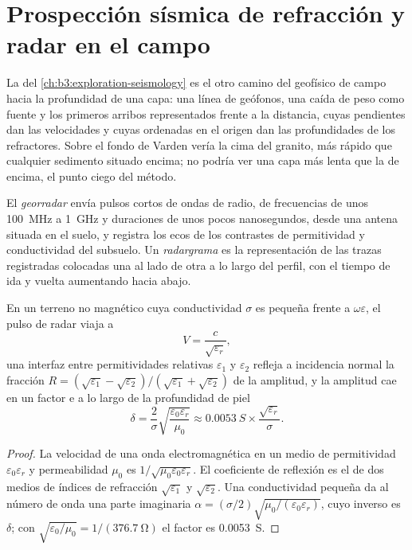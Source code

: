 \section{Prospección sísmica de refracción y radar en el campo}\label{sec:b3:field-lab-methods-3:radar}

La  del \cref{ch:b3:exploration-seismology}
es el otro camino del geofísico de campo hacia la profundidad de una capa: una
línea de geófonos, una caída de peso como fuente y los primeros arribos
representados frente a la distancia, cuyas pendientes dan las velocidades y cuyas
ordenadas en el origen dan las profundidades de los refractores. Sobre el fondo de Varden
vería la cima del granito, más rápido que cualquier sedimento situado encima; no
podría ver una capa más lenta que la de encima, el punto ciego del
método.

\begin{definition}\label{def:b3:field-lab-methods-3:gpr}
El \emph{georradar} envía
pulsos cortos de ondas de radio, de frecuencias de unos \qty{100}{MHz}
a \qty{1}{GHz} y duraciones de unos pocos nanosegundos, desde una antena
situada en el suelo, y registra los ecos de los contrastes de permitividad y
conductividad del subsuelo. Un \emph{radargrama} es la representación
de las trazas registradas colocadas una al lado de otra a lo largo del perfil, con el
tiempo de ida y vuelta aumentando hacia abajo.
\end{definition}

\begin{proposition}\label{prop:b3:field-lab-methods-3:radar}
En un terreno no magnético cuya conductividad $\sigma$ es pequeña frente a
$\omega\varepsilon$, el pulso de radar viaja a
\[
V = \frac{c}{\sqrt{\varepsilon_r}} ,
\]
una interfaz entre permitividades relativas $\varepsilon_1$ y
$\varepsilon_2$ refleja a incidencia normal la fracción $R =
(\sqrt{\varepsilon_1} - \sqrt{\varepsilon_2})/(\sqrt{\varepsilon_1} +
\sqrt{\varepsilon_2})$ de la amplitud, y la amplitud cae en un
factor $\mathrm{e}$ a lo largo de la profundidad de piel
\[
\delta = \frac{2}{\sigma}\sqrt{\frac{\varepsilon_0\varepsilon_r}{\mu_0}}
       \approx \qty{0.0053}{S}\times\frac{\sqrt{\varepsilon_r}}{\sigma} .
\]
\end{proposition}

\begin{proof}
La velocidad de una onda electromagnética en un medio de permitividad
$\varepsilon_0\varepsilon_r$ y permeabilidad $\mu_0$ es
$1/\sqrt{\mu_0\varepsilon_0\varepsilon_r}$. El coeficiente de reflexión
es el de dos medios de índices de refracción $\sqrt{\varepsilon_1}$ y
$\sqrt{\varepsilon_2}$. Una conductividad pequeña da al número de onda una
parte imaginaria $\alpha = (\sigma/2)\sqrt{\mu_0/(\varepsilon_0
\varepsilon_r)}$, cuyo inverso es $\delta$; con $\sqrt{\varepsilon_0/
\mu_0} = 1/(\qty{376.7}{\ohm})$ el factor es \qty{0.0053}{S}.
\end{proof}

